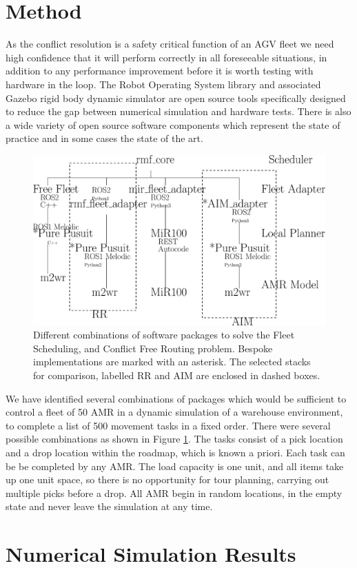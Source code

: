 \documentclass[runningheads]{llncs}
\begin{document}
\section{Method}
As the conflict resolution is a safety critical function of an AGV fleet we need high confidence that it will perform correctly in all foreseeable situations, in addition to any performance improvement before it is worth testing with hardware in the loop. The Robot Operating System library and associated Gazebo rigid body dynamic simulator are open source tools specifically designed to reduce the gap between numerical simulation and hardware tests. There is also a wide variety of open source software components which represent the state of practice and in some cases the state of the art. 
\begin{figure}[htbp]
\centerline{\includegraphics[width=0.7\linewidth]{ros2_fleet_options.eps}}
\caption{Different combinations of software packages to solve the Fleet Scheduling, and Conflict Free Routing problem. Bespoke implementations are marked with an asterisk. The selected stacks for comparison, labelled RR and AIM are enclosed in dashed boxes.}
\label{fig:ros2_fleet_options}
\end{figure}
We have identified several combinations of packages which would be sufficient to control a fleet of 50 AMR in a dynamic simulation of a warehouse environment, to complete a list of 500 movement tasks in a fixed order. There were several possible combinations as shown in Figure \ref{fig:ros2_fleet_options}. The tasks consist of a pick location and a drop location within the roadmap, which is known a priori. Each task can be be completed by any AMR. The load capacity is one unit, and all items take up one unit space, so there is no opportunity for tour planning, carrying out multiple picks before a drop. All AMR begin in random locations, in the empty state and never leave the simulation at any time.  

  
\section{Numerical Simulation Results}
\end{document}
